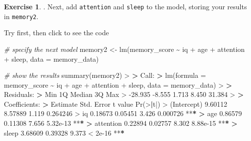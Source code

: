 \documentclass[
]{book}
\newenvironment{Shaded}{\begin{snugshade}}{\end{snugshade}}
\newcommand{\AttributeTok}[1]{\textcolor[rgb]{0.77,0.63,0.00}{#1}}
\newcommand{\CommentTok}[1]{\textcolor[rgb]{0.56,0.35,0.01}{\textit{#1}}}
\newcommand{\ErrorTok}[1]{\textcolor[rgb]{0.64,0.00,0.00}{\textbf{#1}}}
\newcommand{\FloatTok}[1]{\textcolor[rgb]{0.00,0.00,0.81}{#1}}
\newcommand{\FunctionTok}[1]{\textcolor[rgb]{0.00,0.00,0.00}{#1}}
\newcommand{\NormalTok}[1]{#1}
\newcommand{\OtherTok}[1]{\textcolor[rgb]{0.56,0.35,0.01}{#1}}
\newcommand{\SpecialCharTok}[1]{\textcolor[rgb]{0.00,0.00,0.00}{#1}}
\theoremstyle{definition}
\theoremstyle{definition}
\theoremstyle{definition}
\newtheorem{exercise}{Exercise}[chapter]
\theoremstyle{definition}
\theoremstyle{remark}
\begin{document}
\begin{exercise}
\hfill{}. Next, add \texttt{attention} and \texttt{sleep} to the model, storing your results in \texttt{memory2}.

Try first, then click to see the code

\begin{Shaded}
\begin{Highlighting}[]
\CommentTok{\# specify the next model}
\NormalTok{memory2 }\OtherTok{\textless{}{-}} \FunctionTok{lm}\NormalTok{(memory\_score }\SpecialCharTok{\textasciitilde{}}\NormalTok{ iq }\SpecialCharTok{+}\NormalTok{ age }\SpecialCharTok{+}\NormalTok{ attention }\SpecialCharTok{+}\NormalTok{ sleep, }\AttributeTok{data =}\NormalTok{ memory\_data)}

\CommentTok{\# show the results}
\FunctionTok{summary}\NormalTok{(memory2)}
\SpecialCharTok{\textgreater{}} 
\ErrorTok{\textgreater{}}\NormalTok{ Call}\SpecialCharTok{:}
\ErrorTok{\textgreater{}} \FunctionTok{lm}\NormalTok{(}\AttributeTok{formula =}\NormalTok{ memory\_score }\SpecialCharTok{\textasciitilde{}}\NormalTok{ iq }\SpecialCharTok{+}\NormalTok{ age }\SpecialCharTok{+}\NormalTok{ attention }\SpecialCharTok{+}\NormalTok{ sleep, }\AttributeTok{data =}\NormalTok{ memory\_data)}
\SpecialCharTok{\textgreater{}} 
\ErrorTok{\textgreater{}}\NormalTok{ Residuals}\SpecialCharTok{:}
\ErrorTok{\textgreater{}}\NormalTok{     Min      1Q  Median      3Q     Max }
\SpecialCharTok{\textgreater{}} \SpecialCharTok{{-}}\FloatTok{28.935}  \SpecialCharTok{{-}}\FloatTok{8.555}   \FloatTok{1.713}   \FloatTok{8.450}  \FloatTok{31.384} 
\SpecialCharTok{\textgreater{}} 
\ErrorTok{\textgreater{}}\NormalTok{ Coefficients}\SpecialCharTok{:}
\ErrorTok{\textgreater{}}\NormalTok{             Estimate Std. Error t value }\FunctionTok{Pr}\NormalTok{(}\SpecialCharTok{\textgreater{}}\ErrorTok{|}\NormalTok{t}\SpecialCharTok{|}\NormalTok{)    }
\SpecialCharTok{\textgreater{}}\NormalTok{ (Intercept)  }\FloatTok{9.60112}    \FloatTok{8.57889}   \FloatTok{1.119} \FloatTok{0.264246}    
\SpecialCharTok{\textgreater{}}\NormalTok{ iq           }\FloatTok{0.18673}    \FloatTok{0.05451}   \FloatTok{3.426} \FloatTok{0.000726} \SpecialCharTok{**}\ErrorTok{*}
\ErrorTok{\textgreater{}}\NormalTok{ age          }\FloatTok{0.86579}    \FloatTok{0.11308}   \FloatTok{7.656} \FloatTok{5.32e{-}13} \SpecialCharTok{**}\ErrorTok{*}
\ErrorTok{\textgreater{}}\NormalTok{ attention    }\FloatTok{0.22894}    \FloatTok{0.02757}   \FloatTok{8.302} \FloatTok{8.88e{-}15} \SpecialCharTok{**}\ErrorTok{*}
\ErrorTok{\textgreater{}}\NormalTok{ sleep        }\FloatTok{3.68609}    \FloatTok{0.39328}   \FloatTok{9.373}  \SpecialCharTok{\textless{}} \FloatTok{2e{-}16} \SpecialCharTok{**}\ErrorTok{*}

\end{Highlighting}
\end{Shaded}
\end{exercise}
\end{document}
